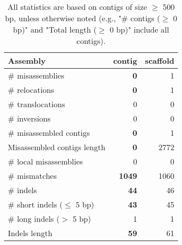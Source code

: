 \documentclass[12pt,a4paper]{article}
\begin{document}
\begin{table}[ht]
\begin{center}
\caption{All statistics are based on contigs of size $\geq$ 500 bp, unless otherwise noted (e.g., "\# contigs ($\geq$ 0 bp)" and "Total length ($\geq$ 0 bp)" include all contigs).}
\begin{tabular}{|l*{2}{|r}|}
\hline
Assembly & contig & scaffold \\ \hline
\# misassemblies & {\bf 0} & 1 \\ \hline
\hspace{5mm}\# relocations & {\bf 0} & 1 \\ \hline
\hspace{5mm}\# translocations & 0 & 0 \\ \hline
\hspace{5mm}\# inversions & 0 & 0 \\ \hline
\# misassembled contigs & {\bf 0} & 1 \\ \hline
Misassembled contigs length & {\bf 0} & 2772 \\ \hline
\# local misassemblies & 0 & 0 \\ \hline
\# mismatches & {\bf 1049} & 1060 \\ \hline
\# indels & {\bf 44} & 46 \\ \hline
\hspace{5mm}\# short indels ($\leq$ 5 bp) & {\bf 43} & 45 \\ \hline
\hspace{5mm}\# long indels ($>$ 5 bp) & 1 & 1 \\ \hline
Indels length & {\bf 59} & 61 \\ \hline
\end{tabular}
\end{center}
\end{table}
\end{document}
